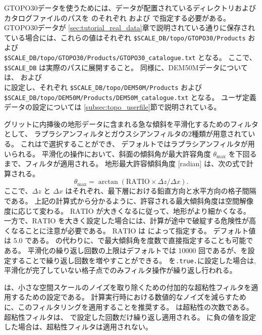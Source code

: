 GTOPO30データを使うためには、データが配置されているディレクトリおよびカタログファイルのパスを  のそれぞれ  および  で指定する必要がある。
GTOPO30データが \ref{sec:tutorial_real_data}章で説明されている通りに保存されている場合には、これらの値はそれぞれ \verb|$SCALE_DB/topo/GTOPO30/Products| および \\ \verb|$SCALE_DB/topo/GTOPO30/Products/GTOPO30_catalogue.txt| となる。
ここで、\verb|$SCALE_DB| は実際のパスに展開すること。
同様に、DEM50Mデータについては、 および \\  に設定し、それぞれ \verb|$SCALE_DB/topo/DEM50M/Products| および \\ \verb|$SCALE_DB/topo/DEM50M/Products/DEM50M_catalogue.txt| となる。
ユーザ定義データの設定については \ref{subsec:topo_userfile}節で説明されている。


\scale グリットに内挿後の地形データに含まれる急な傾斜を平滑化するためのフィルタとして、
ラプラシアンフィルタとガウスシアンフィルタの2種類が用意されている。
これはで選択することができ、
デフォルトではラプラシアンフィルタが用いられる。
平滑化の操作において、斜面の傾斜角が最大許容角度 $\theta_{\max}$ を下回るまで、フィルタが適用される。
地形最大許容傾斜角度 [radian] は、次の式で計算される。
\begin{equation*}
  \theta_{\max} = \arctan( \mathrm{RATIO} \times \Delta z / \Delta x ).
\end{equation*}
ここで、$\Delta z$ と $\Delta x$ はそれぞれ、最下層における鉛直方向と水平方向の格子間隔である。
上記の計算式から分かるように、許容される最大傾斜角度は空間解像度に応じて変わる。
$\mathrm{RATIO}$ が大きくなるに従って、地形がより細かくなる。
一方で、$\mathrm{RATIO}$ を大きく設定した場合には、計算が途中で破綻する危険性が高くなることに注意が必要である。
$\mathrm{RATIO}$ は  によって指定する。
デフォルト値は 5.0 である。
 の代わりに、で最大傾斜角を度数で直接指定することも可能である。
平滑化の繰り返し回数の上限はデフォルトでは 10000 回であるが、を設定することで繰り返し回数を増やすことができる。
を\verb|.true.|に設定した場合は, 平滑化が完了していない格子点でのみフィルタ操作が繰り返し行われる。

は、小さな空間スケールのノイズを取り除くための付加的な超粘性フィルタを適用するための設定である。
計算実行時における数値的なノイズを減らすために、このフィルタリングを適用することを推奨する。
 は超粘性の次数である。
超粘性フィルタは、 で設定した回数だけ繰り返し適用される。
に負の値を設定した場合は、超粘性フィルタは適用されない。

